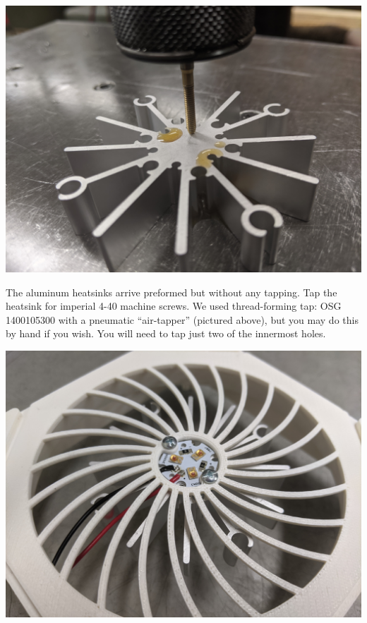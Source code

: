 \documentclass[11pt]{article}
\begin{document}
\begin{center}
  \includegraphics[width=\textwidth/2]{"./tap-heatsink.jpg"}
\end{center}

The aluminum heatsinks arrive preformed but without any tapping.
Tap the heatsink for imperial 4-40 machine screws.
We used thread-forming tap: OSG 1400105300 with a pneumatic ``air-tapper'' (pictured above), but you may do this by hand if you wish.
You will need to tap just two of the innermost holes.

\begin{center}
  \includegraphics[width=\textwidth/2]{"./led-and-heatsink.jpg"}
\end{center}
\end{document}
